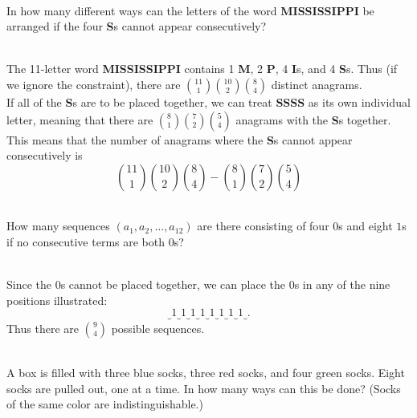 \documentclass{article}
\newenvironment{problem}[2][Problem]{\begin{trivlist}
\item[\hskip \labelsep {\bfseries #1}\hskip \labelsep {\bfseries #2.}]}{\end{trivlist}}
\newenvironment{solution}[1][Solution.]{\begin{trivlist}
\item[\hskip \labelsep {\bfseries #1}]}{\end{trivlist}}
\begin{document}
\begin{problem}{2 (i)} \text{} \\
  In how many different ways can the letters of the word \textbf{MISSISSIPPI}
  be arranged if the four \textbf{S}s cannot appear consecutively?
\end{problem}

\begin{solution} \text{} \\
  The 11-letter word \textbf{MISSISSIPPI} contains 1 \textbf{M}, 2 \textbf{P},
  4 \textbf{I}s, and 4 \textbf{S}s. Thus (if we ignore the constraint), there
  are $\binom{11}{1}\binom{10}{2}\binom{8}{4}$ distinct anagrams.
  \\
  If all of the \textbf{S}s are to be placed together, we can treat
  \textbf{SSSS} as its own individual letter, meaning that there are
  $\binom{8}{1}\binom{7}{2}\binom{5}{4}$ anagrams with the \textbf{S}s together.
  \\
  This means that the number of anagrams where the \textbf{S}s cannot appear
  consecutively is \[
    \binom{11}{1}\binom{10}{2}\binom{8}{4} - \binom{8}{1}\binom{7}{2}\binom{5}{4}
  \]
\end{solution}

\begin{problem}{2 (j)} \text{} \\
  How many sequences $(a_1, a_2, \hdots, a_{12})$ are there consisting of four
  $0$s and eight $1$s if no consecutive terms are both $0$s?
\end{problem}

\begin{solution} \text{} \\
  Since the $0$s cannot be placed together, we can place the $0$s in any of the
  nine positions illustrated: \[
    \underbrace{} 1 \underbrace{} 1 \underbrace{} 1 \underbrace{} 1
    \underbrace{} 1 \underbrace{} 1 \underbrace{} 1 \underbrace{} 1
    \underbrace{}.
  \]
  Thus there are $\binom{9}{4}$ possible sequences.
\end{solution}

\begin{problem}{2 (k)} \text{} \\
  A box is filled with three blue socks, three red socks, and four green
  socks. Eight socks are pulled out, one at a time. In how many ways can this
  be done? (Socks of the same color are indistinguishable.)
\end{problem}
\end{document}
